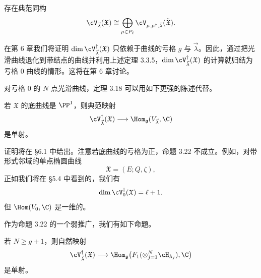 \begin{corollary}[3.20]
存在典范同构
\[
\cV_{\vec{\lambda}}(\mathfrak{X})
\cong\bigoplus_{\mu\in P_\ell}
\cV_{\mu,\mu^{\dagger},\vec{\lambda}}(\tilde{\mathfrak{X}}).
\]
\end{corollary}

\begin{remark}[3.21]
在第 6 章我们将证明
$\dim\cV^{\dagger}_{\vec{\lambda}}(\mathfrak{X})$ 只依赖于曲线的亏格 $g$ 与
$\vec{\lambda}$。因此，通过把光滑曲线退化到带结点的曲线并利用上述定理
3.3.5，$\dim\cV^{\dagger}_{\vec{\lambda}}(\mathfrak{X})$ 的计算就归结为亏格 $0$ 曲线的情形。这将在第 6 章讨论。
\end{remark}

对亏格 $0$ 的 $N$ 点光滑曲线，定理 3.18 可以用如下更强的陈述代替。

\begin{proposition}[3.22]
若 $\mathfrak{X}$ 的底曲线是 $\PP^{1}$，则典范映射
\[
\cV^{\dagger}_{\vec{\lambda}}(\mathfrak{X})
\longrightarrow\Hom_{\mathfrak{g}}(V_{\vec{\lambda}},\C)
\]
是单射。
\end{proposition}

证明将在 §6.1 中给出。注意若底曲线的亏格为正，命题 3.22 不成立。例如，对带形式邻域的单点椭圆曲线
\[
\mathfrak{X}=(E;Q,\zeta),
\]
正如我们将在 §5.4 中看到的，我们有
\[
\dim\cV^{\dagger}_{0}(\mathfrak{X})=\ell+1.
\]
但 $\Hom(V_0,\C)$ 是一维的。

作为命题 3.22 的一个弱推广，我们有如下命题。

\begin{proposition}[3.23]
若 $N\ge g+1$，则自然映射
\[
\cV^{\dagger}_{\vec{\lambda}}(\mathfrak{X})
\longrightarrow\Hom_{\mathfrak{g}}
\bigl(F_1(\otimes_{j=1}^{N}\cH_{\lambda_j}),\C\bigr)
\]
是单射。
\end{proposition}


